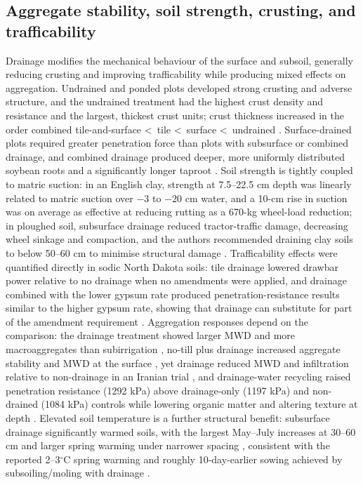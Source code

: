 \documentclass[11pt]{article}
\begin{document}
\subsection{Aggregate stability, soil strength, crusting, and trafficability}

Drainage modifies the mechanical behaviour of the surface and subsoil, generally
reducing crusting and improving trafficability while producing mixed effects on
aggregation. Undrained and ponded plots developed strong crusting and adverse
structure, and the undrained treatment had the highest crust density and resistance
and the largest, thickest crust units; crust thickness increased in the order combined
tile-and-surface \textless\ tile \textless\ surface \textless\ undrained
\parencite{HUNDAL1976,FAUSEY1969}. Surface-drained plots required greater penetration
force than plots with subsurface or combined drainage, and combined drainage produced
deeper, more uniformly distributed soybean roots and a significantly longer taproot
\parencite{FAUSEY1969}. Soil strength is tightly coupled to matric suction: in an
English clay, strength at 7.5--22.5 cm depth was linearly related to matric suction
over $-3$ to $-20$ cm water, and a 10-cm rise in suction was on average as effective
at reducing rutting as a 670-kg wheel-load reduction; in ploughed soil, subsurface
drainage reduced tractor-traffic damage, decreasing wheel sinkage and compaction, and
the authors recommended draining clay soils to below 50--60 cm to minimise structural
damage \parencite{STEINHARDT1974}. Trafficability effects were quantified directly in
sodic North Dakota soils: tile drainage lowered drawbar power relative to no drainage
when no amendments were applied, and drainage combined with the lower gypsum rate
produced penetration-resistance results similar to the higher gypsum rate, showing
that drainage can substitute for part of the amendment requirement
\parencite{Wamono2016,Wamono2016b}. Aggregation responses depend on the comparison:
the drainage treatment showed larger MWD and more macroaggregates than subirrigation
\parencite{Baker2004}, no-till plus drainage increased aggregate stability and MWD at
the surface \parencite{Kumar2014}, yet drainage reduced MWD and infiltration relative
to non-drainage in an Iranian trial \parencite{Shabanpour2022}, and drainage-water
recycling raised penetration resistance (1292 kPa) above drainage-only (1197 kPa) and
non-drained (1084 kPa) controls while lowering organic matter and altering texture at
depth \parencite{Kaur2023}. Elevated soil temperature is a further structural benefit:
subsurface drainage significantly warmed soils, with the largest May--July increases
at 30--60 cm and larger spring warming under narrower spacing
\parencite{Jin2008}, consistent with the reported 2--3$^{\circ}$C spring warming and
roughly 10-day-earlier sowing achieved by subsoiling/moling with drainage
\parencite{PLAMENAC1988}.
\end{document}
